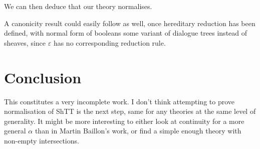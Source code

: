 \documentclass[11pt]{article}
\newcommand{\0}{\mathbf{0}}
\newcommand{\1}{\mathbf{1}}
\begin{document}
We can then deduce that our theory normalises.

A canonicity result could easily follow as well, once hereditary reduction has been defined, with normal form of booleans some variant of dialogue trees instead of sheaves, since $\varepsilon$ has no corresponding reduction rule.
\section{Conclusion}

This constitutes a very incomplete work. I don't think attempting to prove normalisation of ShTT is the next step, same for any theories at the same level of generality. It might be more interesting to either look at continuity for a more general $\alpha$ than in Martin Baillon's work, or find a simple enough theory with non-empty intersections.

%
%

\printbibliography
\end{document}

